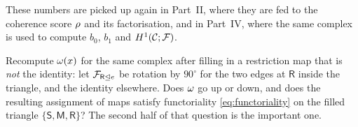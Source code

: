These numbers are picked up again in Part~II, where they are fed to the
coherence score $\rho$ and its factorisation, and in
Part~IV, where the same complex is used to compute
$b_0$, $b_1$ and $H^{1}(\mathcal{C};\mathcal{F})$.

\begin{exercise}
Recompute $\omega(x)$ for the same complex after filling in a
restriction map that is \emph{not} the identity: let
$\mathcal{F}_{\mathsf R\trianglelefteq e}$ be rotation by $90^\circ$ for the two edges
at $\mathsf R$ inside the triangle, and the identity elsewhere. Does
$\omega$ go up or down, and does the resulting assignment of maps
satisfy functoriality \eqref{eq:functoriality} on the filled triangle
$\{\mathsf S,\mathsf M,\mathsf R\}$? The second half of that question is
the important one.
\end{exercise}
